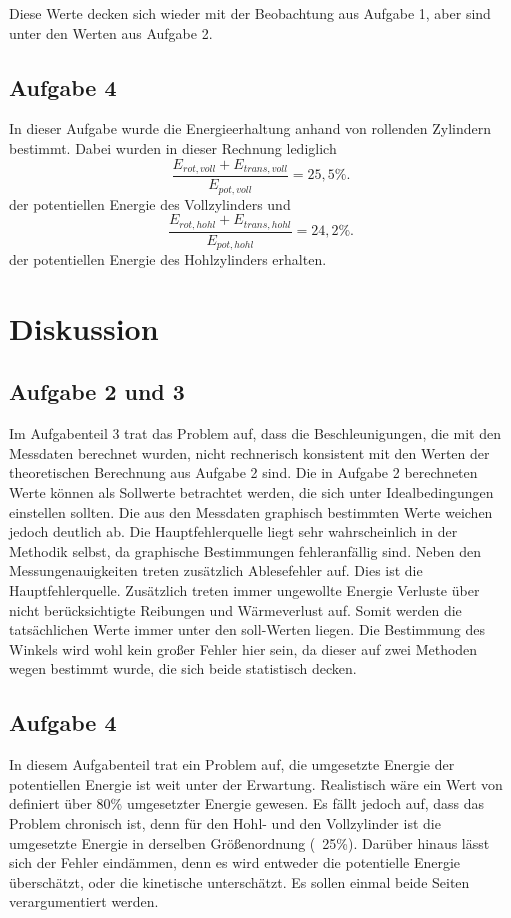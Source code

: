 Diese Werte decken sich wieder mit der Beobachtung aus Aufgabe 1, aber sind unter den Werten aus Aufgabe 2.

\subsection{Aufgabe 4}
In dieser Aufgabe wurde die Energieerhaltung anhand von rollenden Zylindern bestimmt. Dabei wurden in dieser Rechnung lediglich 
\begin{equation}
    \frac{E_{rot,voll} + E_{trans,voll} }{E_{pot,voll}} = 25,5\%.
\end{equation}
der potentiellen Energie des Vollzylinders und 
\begin{equation}
    \frac{E_{rot,hohl} + E_{trans,hohl} }{E_{pot,hohl}} = 24,2\%.
\end{equation}
der potentiellen Energie des Hohlzylinders erhalten. 


\section{Diskussion}
\subsection{Aufgabe 2 und 3}
Im Aufgabenteil 3 trat das Problem auf, dass die Beschleunigungen, die mit den Messdaten berechnet wurden, nicht rechnerisch konsistent mit den Werten der theoretischen Berechnung aus Aufgabe 2 sind. Die in Aufgabe 2 berechneten Werte können als Sollwerte betrachtet werden, die sich unter Idealbedingungen einstellen sollten. Die aus den Messdaten graphisch bestimmten Werte weichen jedoch deutlich ab. Die Hauptfehlerquelle liegt sehr wahrscheinlich in der Methodik selbst, da graphische Bestimmungen fehleranfällig sind. Neben den Messungenauigkeiten treten zusätzlich Ablesefehler auf. Dies ist die Hauptfehlerquelle. Zusätzlich treten immer ungewollte Energie Verluste über nicht berücksichtigte Reibungen und Wärmeverlust auf. Somit werden die tatsächlichen Werte immer unter den soll-Werten liegen. Die Bestimmung des Winkels wird wohl kein großer Fehler hier sein, da dieser auf zwei Methoden wegen bestimmt wurde, die sich beide statistisch decken. 

\subsection{Aufgabe 4}
In diesem Aufgabenteil trat ein Problem auf, die umgesetzte Energie der potentiellen Energie ist weit unter der Erwartung. Realistisch wäre ein Wert von definiert über 80\% umgesetzter Energie gewesen. Es fällt jedoch auf, dass das Problem chronisch ist, denn für den Hohl- und den Vollzylinder ist die umgesetzte Energie in derselben Größenordnung (~25\%). 
Darüber hinaus lässt sich der Fehler eindämmen, denn es wird entweder die potentielle Energie überschätzt, oder die kinetische unterschätzt. Es sollen einmal beide Seiten verargumentiert werden.
